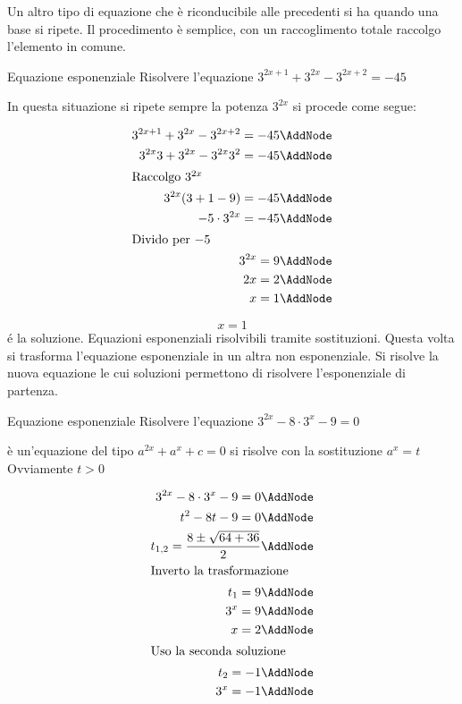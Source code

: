 Un altro tipo di equazione che è riconducibile alle precedenti si ha quando una base si ripete. Il procedimento è semplice, con un raccoglimento totale raccolgo l'elemento in comune. 
\begin{esempiot}{Equazione esponenziale}{}
	Risolvere l'equazione $3^{2x+1}+3^{2x}-3^{2x+2}=-45$
\end{esempiot}
	In questa situazione si ripete sempre la potenza $3^{2x}$  si procede come segue:
	\begin{NodesList}[margin=4cm]
		\begin{align*}
			3^{2x+1}+3^{2x}-3^{2x+2}=-45\AddNode\\
			3^{2x}3+3^{2x}-3^{2x}3^2=-45\AddNode\\
			\intertext{\hfil Raccolgo $3^{2x}$}
			3^{2x}(3+1-9)=-45\AddNode\\
			-5\cdot 3^{2x}=-45\AddNode\\
			\intertext{\hfil Divido per $-5$}
			3^{2x}=9\AddNode\\
			2x=2\AddNode\\
			x=1\AddNode
		\end{align*}
	\end{NodesList}
	\[x=1\]
	\'{e} la soluzione.
Equazioni esponenziali risolvibili tramite sostituzioni. Questa volta si trasforma l'equazione esponenziale in un altra non esponenziale. Si risolve la nuova equazione le cui soluzioni permettono di risolvere l'esponenziale di partenza.
\begin{esempiot}{Equazione esponenziale}{}
	Risolvere l'equazione $3^{2x}-8\cdot 3^x-9=0$
\end{esempiot}
	 è un'equazione del tipo $a^{2x}+a^{x}+c=0$ si risolve con la sostituzione $a^{x}=t$ Ovviamente $t>0$ 
	\begin{NodesList} [margin=4cm]
		\begin{align*}
			3^{2x}-8\cdot 3^x-9=0\AddNode\\
			t^2-8t-9=0\AddNode\\
			t_{1,2}=\dfrac{8\pm\sqrt{64+36}}{2}\AddNode\\
			\intertext{\hfil Inverto la trasformazione}
			t_{1}=9\AddNode\\
			3^{x}=9\AddNode\\
			x=2\AddNode\\
			\intertext{\hfil Uso la seconda soluzione}
			t_{2}=-1\AddNode\\
			3^x=-1\AddNode
		\end{align*}
		\LinkNodes{}%
	\end{NodesList}
